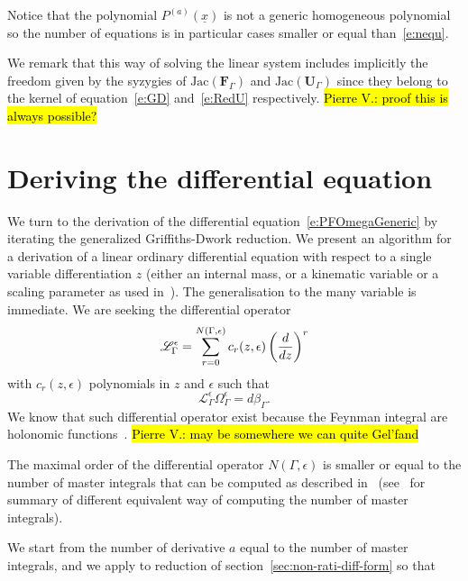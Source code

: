 \documentclass[a4paper,12pt]{article}
\numberwithin{equation}{section}
\numberwithin{figure}{section}
\newcommand{\pvnote}[1]{\sethlcolor{bubblegum} \protect\hl{Pierre V.: #1} \sethlcolor{yellow}}
\begin{document}
Notice that the polynomial $P^{(a)}(\underline x)$ is not a generic
homogeneous polynomial so the number of equations is in particular
cases smaller or equal than~\eqref{e:nequ}.


We remark that this way of solving the linear system includes implicitly the
freedom given by the syzygies of $\textrm{Jac}(\textbf{F}_\Gamma)$ and
$\textrm{Jac}(\textbf{U}_\Gamma)$ since they belong to
the kernel of equation~\eqref{e:GD} and~\eqref{e:RedU} respectively.
%
%
\pvnote{proof this is always possible?}


%
%
\section{Deriving the differential equation}
\label{sec:deriv-diff-equat}

We turn to the derivation of the differential
equation~\eqref{e:PFOmegaGeneric}  by iterating the generalized
Griffiths-Dwork reduction. We present an algorithm for a derivation of
a linear ordinary differential equation with respect to a single
variable differentiation $z$ (either an internal mass, or a kinematic
variable or a scaling parameter as used
in~\cite{Lairez:2022zkj,Doran:2023yzu}). The generalisation to the
many variable is immediate. We are seeking the differential operator %
%
\begin{equation}\label{e:PFgeneric}
  \mathscr{L}_\Gamma^\epsilon=\sum_{r=0}^{N(\Gamma,\epsilon)}
  c_r(z,\epsilon) \left(d\over dz\right)^r
\end{equation}
with $c_r(z,\epsilon)$ polynomials in $z$ and $\epsilon$ such that
\begin{equation}
     \mathscr{L}_\Gamma^\epsilon \Omega_\Gamma^\epsilon= d\beta_\Gamma.
   \end{equation}
We know that such differential operator exist because the Feynman
integral are holonomic
functions~\cite{Smirnov:2010hn,Bitoun:2017nre,Lee:2013hzt}.
\pvnote{may be somewhere we can quite Gel'fand}


   The maximal order of the differential operator
$N(\Gamma,\epsilon)$ is smaller or equal to the number of master
integrals that can be computed as described
in~\cite{Bitoun:2017nre,Lee:2013hzt} (see~\cite{Agostini:2022cgv} for
summary of different equivalent way of computing the number of master integrals).

We start from the number of derivative $a$ equal to the
number of master integrals, and we apply to reduction of
section~\ref{sec:non-rati-diff-form} so that
\end{document}
